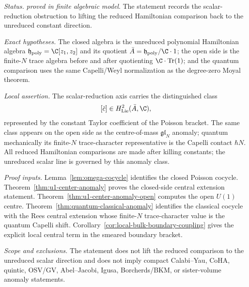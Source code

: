 \begin{stmt}\label{thm:lane-u1-anomaly}
  \emph{Status.} \emph{proved in finite algebraic model}.  The statement
  records the scalar-reduction obstruction to lifting the reduced
  Hamiltonian comparison back to the unreduced constant direction.

  \emph{Exact hypotheses.} The closed algebra is the unreduced polynomial
  Hamiltonian algebra \(\mathfrak h_{\mathrm{poly}}=\C[z_1,z_2]\) and
  its quotient \(\bar A=\mathfrak h_{\mathrm{poly}}/\C\cdot1\); the open
  side is the finite-\(N\) trace algebra before and after quotienting
  \(\C\cdot\operatorname{Tr}(1)\); and the quantum comparison uses the
  same Capelli/Weyl normalization as the degree-zero Moyal theorem.

  \emph{Local assertion.} The scalar-reduction axis carries the
  distinguished class
  \[
    [\bar c]\in H^2_{\mathrm{Lie}}(\bar A,\C),
  \]
  represented by the constant Taylor coefficient of the Poisson
  bracket.  The same class appears on the open side as the
  centre-of-mass \(\mathfrak{gl}_N\) anomaly; quantum mechanically its
  finite-\(N\) trace-character representative is the Capelli contact
  \(\hbar N\).  All reduced Hamiltonian comparisons are made after
  killing constants; the unreduced scalar line is governed by this
  anomaly class.

  \emph{Proof inputs.}
  Lemma~\ref{lem:omega-cocycle} identifies the closed Poisson cocycle.
  Theorem~\ref{thm:u1-center-anomaly} proves the closed-side central
  extension statement.  Theorem~\ref{thm:u1-center-anomaly-open}
  computes the open \(U(1)\) centre.  Theorem~\ref{thm:quantum-classical-anomaly}
  identifies the classical cocycle with the Rees central extension whose
  finite-\(N\) trace-character value is the quantum Capelli shift.
  Corollary~\ref{cor:local-bulk-boundary-coupling} gives the explicit
  local central term in the smeared boundary bracket.

  \emph{Scope and exclusions.} The statement does not lift the reduced comparison to the
  unreduced scalar direction and does not imply compact Calabi--Yau,
  CoHA, quintic, OSV/GV, Abel--Jacobi, Igusa, Borcherds/BKM, or
  sister-volume anomaly statements.
\end{stmt}
